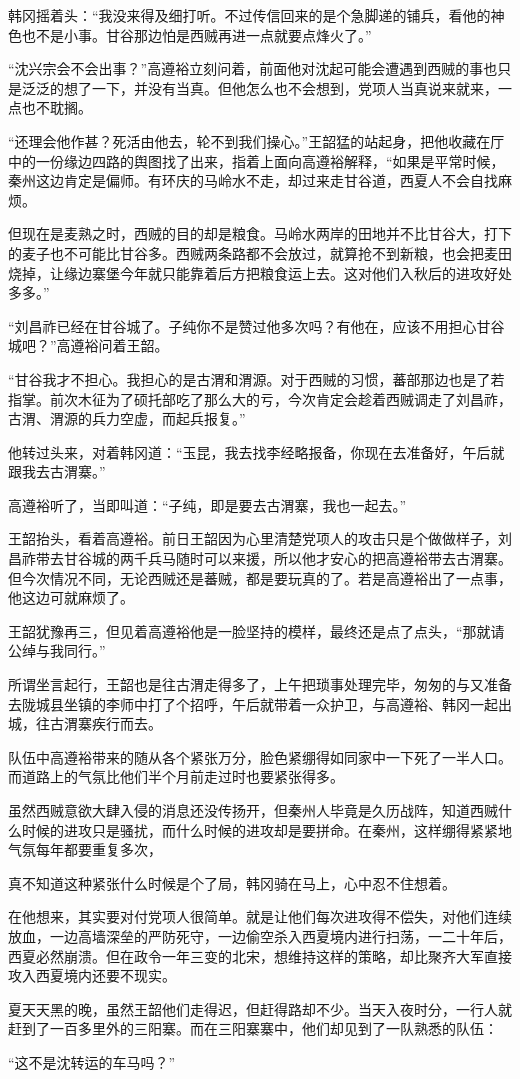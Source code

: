 韩冈摇着头：“我没来得及细打听。不过传信回来的是个急脚递的铺兵，看他的神色也不是小事。甘谷那边怕是西贼再进一点就要点烽火了。”

“沈兴宗会不会出事？”高遵裕立刻问着，前面他对沈起可能会遭遇到西贼的事也只是泛泛的想了一下，并没有当真。但他怎么也不会想到，党项人当真说来就来，一点也不耽搁。

“还理会他作甚？死活由他去，轮不到我们操心。”王韶猛的站起身，把他收藏在厅中的一份缘边四路的舆图找了出来，指着上面向高遵裕解释，“如果是平常时候，秦州这边肯定是偏师。有环庆的马岭水不走，却过来走甘谷道，西夏人不会自找麻烦。

但现在是麦熟之时，西贼的目的却是粮食。马岭水两岸的田地并不比甘谷大，打下的麦子也不可能比甘谷多。西贼两条路都不会放过，就算抢不到新粮，也会把麦田烧掉，让缘边寨堡今年就只能靠着后方把粮食运上去。这对他们入秋后的进攻好处多多。”

“刘昌祚已经在甘谷城了。子纯你不是赞过他多次吗？有他在，应该不用担心甘谷城吧？”高遵裕问着王韶。

“甘谷我才不担心。我担心的是古渭和渭源。对于西贼的习惯，蕃部那边也是了若指掌。前次木征为了硕托部吃了那么大的亏，今次肯定会趁着西贼调走了刘昌祚，古渭、渭源的兵力空虚，而起兵报复。”

他转过头来，对着韩冈道：“玉昆，我去找李经略报备，你现在去准备好，午后就跟我去古渭寨。”

高遵裕听了，当即叫道：“子纯，即是要去古渭寨，我也一起去。”

王韶抬头，看着高遵裕。前日王韶因为心里清楚党项人的攻击只是个做做样子，刘昌祚带去甘谷城的两千兵马随时可以来援，所以他才安心的把高遵裕带去古渭寨。但今次情况不同，无论西贼还是蕃贼，都是要玩真的了。若是高遵裕出了一点事，他这边可就麻烦了。

王韶犹豫再三，但见着高遵裕他是一脸坚持的模样，最终还是点了点头，“那就请公绰与我同行。”

所谓坐言起行，王韶也是往古渭走得多了，上午把琐事处理完毕，匆匆的与又准备去陇城县坐镇的李师中打了个招呼，午后就带着一众护卫，与高遵裕、韩冈一起出城，往古渭寨疾行而去。

队伍中高遵裕带来的随从各个紧张万分，脸色紧绷得如同家中一下死了一半人口。而道路上的气氛比他们半个月前走过时也要紧张得多。

虽然西贼意欲大肆入侵的消息还没传扬开，但秦州人毕竟是久历战阵，知道西贼什么时候的进攻只是骚扰，而什么时候的进攻却是要拼命。在秦州，这样绷得紧紧地气氛每年都要重复多次，

真不知道这种紧张什么时候是个了局，韩冈骑在马上，心中忍不住想着。

在他想来，其实要对付党项人很简单。就是让他们每次进攻得不偿失，对他们连续放血，一边高墙深垒的严防死守，一边偷空杀入西夏境内进行扫荡，一二十年后，西夏必然崩溃。但在政令一年三变的北宋，想维持这样的策略，却比聚齐大军直接攻入西夏境内还要不现实。

夏天天黑的晚，虽然王韶他们走得迟，但赶得路却不少。当天入夜时分，一行人就赶到了一百多里外的三阳寨。而在三阳寨寨中，他们却见到了一队熟悉的队伍：

“这不是沈转运的车马吗？”

